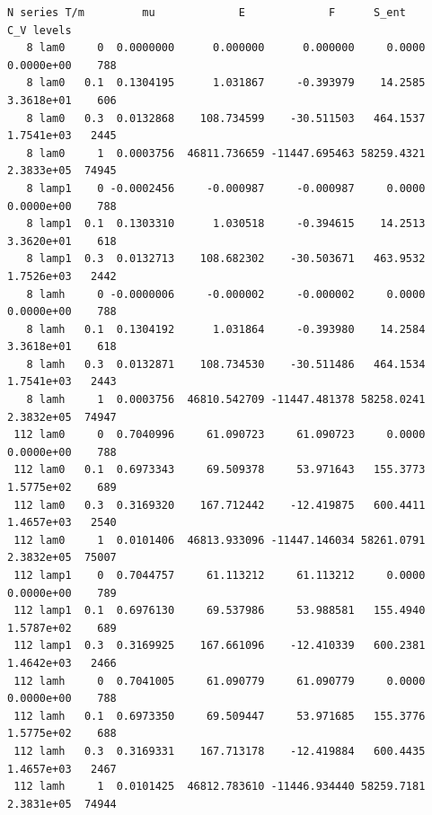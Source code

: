 \documentclass[11pt]{article}
\begin{document}
\begin{Verbatim}[fontsize=\small]
   N series T/m         mu             E             F      S_ent        C_V levels
   8 lam0     0  0.0000000      0.000000      0.000000     0.0000 0.0000e+00    788
   8 lam0   0.1  0.1304195      1.031867     -0.393979    14.2585 3.3618e+01    606
   8 lam0   0.3  0.0132868    108.734599    -30.511503   464.1537 1.7541e+03   2445
   8 lam0     1  0.0003756  46811.736659 -11447.695463 58259.4321 2.3833e+05  74945
   8 lamp1    0 -0.0002456     -0.000987     -0.000987     0.0000 0.0000e+00    788
   8 lamp1  0.1  0.1303310      1.030518     -0.394615    14.2513 3.3620e+01    618
   8 lamp1  0.3  0.0132713    108.682302    -30.503671   463.9532 1.7526e+03   2442
   8 lamh     0 -0.0000006     -0.000002     -0.000002     0.0000 0.0000e+00    788
   8 lamh   0.1  0.1304192      1.031864     -0.393980    14.2584 3.3618e+01    618
   8 lamh   0.3  0.0132871    108.734530    -30.511486   464.1534 1.7541e+03   2443
   8 lamh     1  0.0003756  46810.542709 -11447.481378 58258.0241 2.3832e+05  74947
 112 lam0     0  0.7040996     61.090723     61.090723     0.0000 0.0000e+00    788
 112 lam0   0.1  0.6973343     69.509378     53.971643   155.3773 1.5775e+02    689
 112 lam0   0.3  0.3169320    167.712442    -12.419875   600.4411 1.4657e+03   2540
 112 lam0     1  0.0101406  46813.933096 -11447.146034 58261.0791 2.3832e+05  75007
 112 lamp1    0  0.7044757     61.113212     61.113212     0.0000 0.0000e+00    789
 112 lamp1  0.1  0.6976130     69.537986     53.988581   155.4940 1.5787e+02    689
 112 lamp1  0.3  0.3169925    167.661096    -12.410339   600.2381 1.4642e+03   2466
 112 lamh     0  0.7041005     61.090779     61.090779     0.0000 0.0000e+00    788
 112 lamh   0.1  0.6973350     69.509447     53.971685   155.3776 1.5775e+02    688
 112 lamh   0.3  0.3169331    167.713178    -12.419884   600.4435 1.4657e+03   2467
 112 lamh     1  0.0101425  46812.783610 -11446.934440 58259.7181 2.3831e+05  74944
\end{Verbatim}
\end{document}
